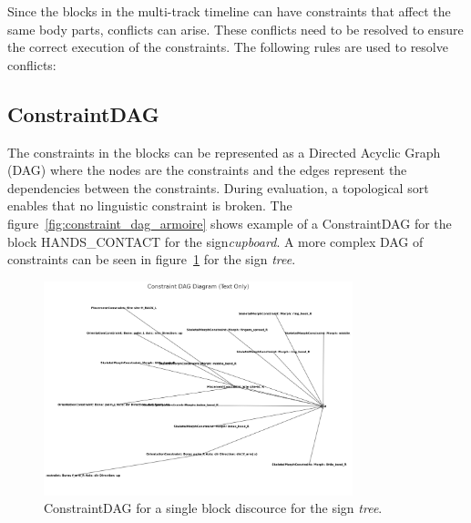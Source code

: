 \documentclass[../../main.tex]{subfiles}
\begin{document}
Since the blocks in the multi-track timeline can have constraints that affect the same body parts, conflicts can arise. These conflicts need to be resolved to ensure the correct execution of the constraints. The following rules are used to resolve conflicts:

\subsection{ConstraintDAG}
\label{ch:multi_track:resolve_conflitcs:constraint_dag}

The constraints in the blocks can be represented as a Directed Acyclic Graph (DAG) where the nodes are the constraints and the edges represent the dependencies between the constraints. During evaluation, a topological sort enables that no linguistic constraint is broken. The figure~\ref{fig:constraint_dag_armoire} shows example of a ConstraintDAG for the block HANDS_CONTACT for the sign\emph{cupboard}. A more complex DAG of constraints can be seen in figure~\ref{fig:constraint_dag_tree} for the sign \emph{tree}.

\begin{figure}[h]
    \centering
    \includegraphics[width=0.8\textwidth]{chapters/multi_track/images/constraint_dag.png}
    \caption{ConstraintDAG for a single block discource for the sign \emph{tree}.}
    \label{fig:constraint_dag_tree}
\end{figure}
\end{document}
